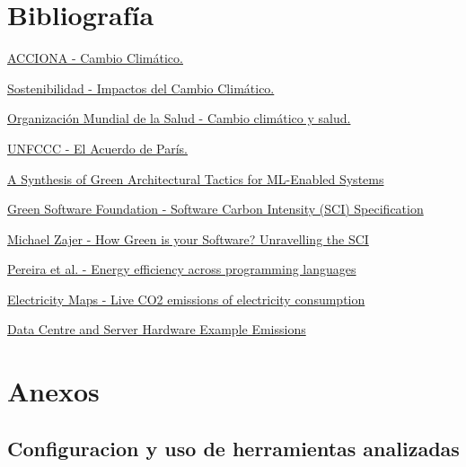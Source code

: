 \documentclass[12pt,a4paper]{report}
\begin{document}
\chapter*{Bibliografía}
\begin{thebibliography}{99}
  \hypertarget{bib:1}{}\href{https://www.acciona.com/es/cambio-climatico}{ACCIONA - Cambio Climático.}

  \hypertarget{bib:2}{}\href{https://www.sostenibilidad.com/cambio-climatico/impactos-cambio-climatico/}{Sostenibilidad - Impactos del Cambio Climático. }

  \hypertarget{bib:3}{}\href{https://www.who.int/es/news-room/fact-sheets/detail/climate-change-and-health}{Organización Mundial de la Salud - Cambio climático y salud. }

  \hypertarget{bib:4}{}\href{https://unfccc.int/es/acerca-de-las-ndc/el-acuerdo-de-paris}{UNFCCC - El Acuerdo de París. }

  \hypertarget{bib:5}{}\href{https://arxiv.org/abs/2312.09610}{A Synthesis of Green Architectural Tactics for ML-Enabled Systems}

  \hypertarget{bib:6}{}\href{https://sci.greensoftware.foundation/}{Green Software Foundation - Software Carbon Intensity (SCI) Specification}

  \hypertarget{bib:7}{}\href{https://www.v2.ai/insights/how-green-is-your-software-unravelling-the-software-carbon-intensity}{Michael Zajer - How Green is your Software? Unravelling the SCI}

  \hypertarget{bib:8}{}\href{https://greenlab.di.uminho.pt/wp-content/uploads/2017/10/sleFinal.pdf}{Pereira et al. - Energy efficiency across programming languages}

  \hypertarget{bib:9}{}\href{https://app.electricitymaps.com/map}{Electricity Maps - Live CO2 emissions of electricity consumption}

  \hypertarget{bib:10}{}\href{https://www.techcarbonstandard.org/technology-categories/lifecycle/example/server}{Data Centre and Server Hardware Example Emissions}
\end{thebibliography}

\appendix
\chapter{Anexos}
\section{Configuracion y uso de herramientas analizadas}
\end{document}

